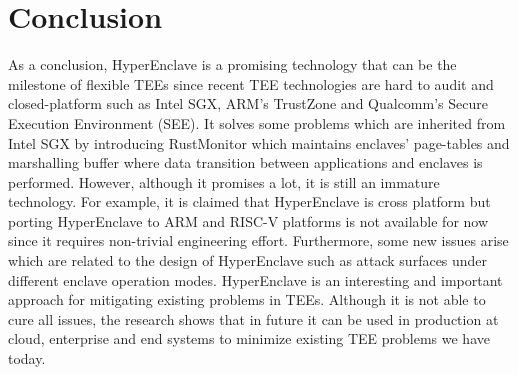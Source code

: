 \section{Conclusion}

As a conclusion, HyperEnclave is a promising technology that can be the milestone of flexible TEEs since recent TEE technologies are hard to audit and closed-platform such as Intel SGX, ARM’s TrustZone and Qualcomm’s Secure Execution Environment (SEE). It solves some problems which are inherited from Intel SGX by introducing RustMonitor which maintains enclaves’ page-tables and marshalling buffer where data transition between applications and enclaves is performed. However, although it promises a lot, it is still an immature technology. For example, it is claimed that HyperEnclave is cross platform but porting HyperEnclave to ARM and RISC-V platforms is not available for now since it requires non-trivial engineering effort. Furthermore, some new issues arise which are related to the design of HyperEnclave such as attack surfaces under different enclave operation modes.
HyperEnclave is an interesting and important approach for mitigating existing problems in TEEs. Although it is not able to cure all issues, the research shows that in future it can be used in production at cloud, enterprise and end systems to minimize existing TEE problems we have today. 







